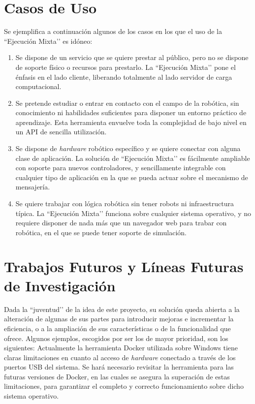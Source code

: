 \section{Casos de Uso }
Se ejemplifica a continuación algunos de los casos en los que el uso de la ``Ejecución Mixta’’ es idóneo:
\begin{enumerate}
\item Se dispone de un servicio que se quiere prestar al público, pero no se dispone de soporte físico o recursos para prestarlo. La ``Ejecución Mixta’’ pone el énfasis en el lado cliente, liberando totalmente al lado servidor de carga computacional.
\item Se pretende estudiar o entrar en contacto con el campo de la robótica, sin conocimiento ni habilidades suficientes para disponer un entorno práctico de aprendizaje. Esta herramienta envuelve toda la complejidad de bajo nivel en un API de sencilla utilización.
\item Se dispone de \textit{hardware} robótico específico y se quiere conectar con alguna clase de aplicación. La solución de ``Ejecución Mixta’’ es fácilmente ampliable con soporte para nuevos controladores, y sencillamente integrable con cualquier tipo de aplicación en la que se pueda actuar sobre el mecanismo de mensajería.
\item Se quiere trabajar con lógica robótica sin tener robots ni infraestructura típica. La ``Ejecución Mixta’’ funciona sobre cualquier sistema operativo, y no requiere disponer de nada más que un navegador web para trabar con robótica, en el que se puede tener soporte de simulación.
\end{enumerate}

\section{Trabajos Futuros y Líneas Futuras de Investigación }
Dada la ``juventud’’ de la idea de este proyecto, su solución queda abierta a la alteración de algunas de sus partes para introducir mejoras e incrementar la eficiencia, o a la ampliación de sus características o de la funcionalidad que ofrece. Algunos ejemplos, escogidos por ser los de mayor prioridad, son los siguientes:
Actualmente la herramienta Docker utilizada sobre Windows tiene claras limitaciones en cuanto al acceso de \textit{hardware} conectado a través de los puertos USB del sistema. Se hará necesario revisitar la herramienta para las futuras versiones de Docker, en las cuales se asegura la superación de estas limitaciones, para garantizar el completo y correcto funcionamiento sobre dicho sistema operativo.

